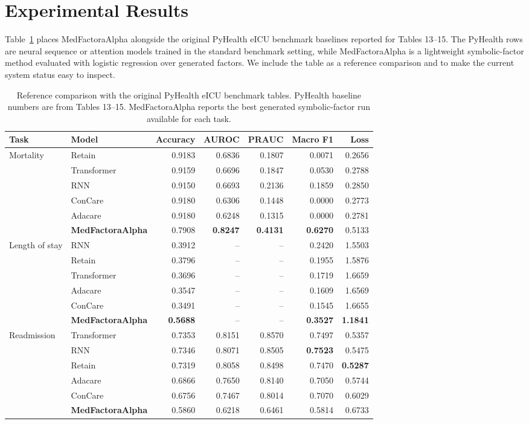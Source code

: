 \documentclass[letterpaper]{article}
\begin{document}
\section{Experimental Results}

Table~\ref{tab:pyhealth-comparison} places MedFactoraAlpha alongside the original PyHealth eICU benchmark baselines reported for Tables 13--15. The PyHealth rows are neural sequence or attention models trained in the standard benchmark setting, while MedFactoraAlpha is a lightweight symbolic-factor method evaluated with logistic regression over generated factors. We include the table as a reference comparison and to make the current system status easy to inspect.

\begin{table}[t]
\centering
\small
\begin{tabular}{llrrrrr}
\toprule
Task & Model & Accuracy & AUROC & PRAUC & Macro F1 & Loss\\
\midrule
\multirow{6}{*}{Mortality}
& Retain & 0.9183 & 0.6836 & 0.1807 & 0.0071 & 0.2656\\
& Transformer & 0.9159 & 0.6696 & 0.1847 & 0.0530 & 0.2788\\
& RNN & 0.9150 & 0.6693 & 0.2136 & 0.1859 & 0.2850\\
& ConCare & 0.9180 & 0.6306 & 0.1448 & 0.0000 & 0.2773\\
& Adacare & 0.9180 & 0.6248 & 0.1315 & 0.0000 & 0.2781\\
& \textbf{MedFactoraAlpha} & 0.7908 & \textbf{0.8247} & \textbf{0.4131} & \textbf{0.6270} & 0.5133\\
\midrule
\multirow{6}{*}{Length of stay}
& RNN & 0.3912 & -- & -- & 0.2420 & 1.5503\\
& Retain & 0.3796 & -- & -- & 0.1955 & 1.5876\\
& Transformer & 0.3696 & -- & -- & 0.1719 & 1.6659\\
& Adacare & 0.3547 & -- & -- & 0.1609 & 1.6569\\
& ConCare & 0.3491 & -- & -- & 0.1545 & 1.6655\\
& \textbf{MedFactoraAlpha} & \textbf{0.5688} & -- & -- & \textbf{0.3527} & \textbf{1.1841}\\
\midrule
\multirow{6}{*}{Readmission}
& Transformer & 0.7353 & 0.8151 & 0.8570 & 0.7497 & 0.5357\\
& RNN & 0.7346 & 0.8071 & 0.8505 & \textbf{0.7523} & 0.5475\\
& Retain & 0.7319 & 0.8058 & 0.8498 & 0.7470 & \textbf{0.5287}\\
& Adacare & 0.6866 & 0.7650 & 0.8140 & 0.7050 & 0.5744\\
& ConCare & 0.6756 & 0.7467 & 0.8014 & 0.7070 & 0.6029\\
& \textbf{MedFactoraAlpha} & 0.5860 & 0.6218 & 0.6461 & 0.5814 & 0.6733\\
\bottomrule
\end{tabular}
\caption{Reference comparison with the original PyHealth eICU benchmark tables. PyHealth baseline numbers are from Tables 13--15. MedFactoraAlpha reports the best generated symbolic-factor run available for each task.}
\label{tab:pyhealth-comparison}
\end{table}
\end{document}
